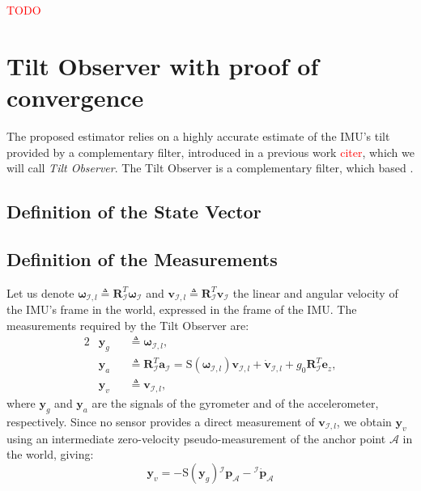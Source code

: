 \documentclass{IJCAS}
\begin{document}
\textcolor{red}{TODO}

\section{Tilt Observer with proof of convergence}
The proposed estimator relies on a highly accurate estimate of the IMU's tilt provided by a complementary filter, introduced in a previous work \textcolor{red}{citer}, which we will call \emph{Tilt Observer}. The Tilt Observer is a complementary filter, which based .

\subsection{Definition of the State Vector}

\subsection{Definition of the Measurements}
Let us denote $\boldsymbol{\omega}_{\mathcal{I}, l} \triangleq \boldsymbol{R}^{T}_{\mathcal{I}} \boldsymbol{\omega}_{\mathcal{I}} $ and $\boldsymbol{v}_{\mathcal{I}, l} \triangleq \boldsymbol{R}^{T}_{\mathcal{I}} \boldsymbol{v}_{\mathcal{I}}$ the linear and angular velocity of the IMU's frame in the world, expressed in the frame of the IMU.
The measurements required by the Tilt Observer are:
\begin{alignat}{2}
         &\boldsymbol{y}_{g}    && \triangleq \boldsymbol{\omega}_{\mathcal{I}, l}, \\
         &\boldsymbol{y}_{a}    && \triangleq \boldsymbol{R}^{T}_{\mathcal{I}} \boldsymbol{a}_{\mathcal{I}} = \text{S}\! \left( \boldsymbol{\omega}_{\mathcal{I}, l} \right) \boldsymbol{v}_{\mathcal{I}, l} + \dot{\boldsymbol{v}}_{\mathcal{I}, l} + g_0 \boldsymbol{R}^{T}_{\mathcal{I}} \boldsymbol{e}_z, \\
         &\boldsymbol{y}_{v}    && \triangleq \boldsymbol{v}_{\mathcal{I}, l},
\end{alignat}
where $\boldsymbol{y}_{g}$ and $\boldsymbol{y}_{a}$ are the signals of the gyrometer and of the accelerometer, respectively.
Since no sensor provides a direct measurement of $\boldsymbol{v}_{\mathcal{I}, l}$, we obtain $\boldsymbol{y}_{v}$ using an intermediate zero-velocity pseudo-measurement of the anchor point $\mathcal{A}$ in the world, giving:
\begin{equation}
    \boldsymbol{y}_v = - \text{S}\!\left( {\boldsymbol{y}_{g}} \right) {^{\mathcal{I}}}\boldsymbol{p}_{\mathcal{A}} - {^{\mathcal{I}}} \dot{\boldsymbol{p}}_{\mathcal{A}} \label{eq:yv}
\end{equation}
\end{document}
